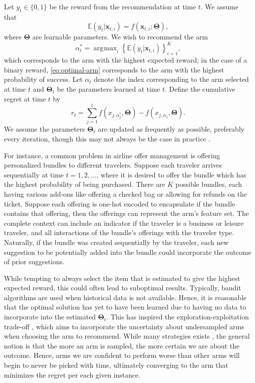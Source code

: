 \documentclass[12pt]{article}
\DeclareMathOperator*{\argmax}{\arg\!\max}
\begin{document}
Let $y_t \in \{0,1\}$ be the reward from the recommendation at time $t$. 
We assume that 
\begin{equation}
\mathbb{E}(y_t \vert \bm{x}_{t,i}) = f(\bm{x}_{t,i}; \bm{\Theta}),
\end{equation}
where $\bm{\Theta}$ are learnable parameters.
We wish to recommend the arm 
\begin{equation}
\alpha_t^* = \argmax_i \left\{\mathbb{E}(y_t \vert \bm{x}_{t,i})\right\}_{i = 1}^K,
\label{eq:optimal-arm}
\end{equation}
which corresponds to the arm with the highest expected reward; in the case of 
a binary reward, \eqref{eq:optimal-arm} corresponds to the arm with the highest 
probability of success.  
Let $\alpha_t$ denote the index corresponding to the arm selected at time $t$ and 
$\bm{\Theta}_t$ be the parameters learned at time $t$.
Define the cumulative regret at time $t$ by
\begin{equation}
r_t = \sum_{j = 1}^{t} 
f(x_{j, \alpha_j^*}, \bm{\Theta}) 
- f(x_{j, \alpha_j}, \bm{\Theta}).
\label{eq:regret}
\end{equation}
We assume the parameters $\bm{\Theta}_t$ are updated as frequently as 
possible, preferably every iteration, though this may not always be the case in 
practice \cite{joulani2013online}.

For instance, a common problem in airline offer management is offering 
personalized bundles to different travelers.
Suppose each traveler arrives sequentially at time $t = 1, 2, \ldots$, where
it is desired to offer the bundle which has the highest probability of being
purchased.
There are $K$ possible bundles, each having various add-ons like offering a
checked bag or allowing for refunds on the ticket.
Suppose each offering is one-hot encoded to encapsulate if the bundle contains
that offering, then the offerings can represent the arm's feature set.
The complete context can include an indicator if the traveler is a business 
or leisure traveler, and all interactions of the bundle's offerings with the 
traveler type. 
Naturally, if the bundle was created sequentially by the traveler, each new
suggestion to be potentially added into the bundle could incorporate the 
outcome of prior suggestions.

While tempting to always select the item that is estimated to give the highest
expected reward, this could often lead to suboptimal results.
Typically, bandit algorithms are used when historical data is not available.  
Hence, it is reasonable that the optimal solution has yet to have been learned due
to having no data to incorporate into the estimated $\bm{\Theta}_t$.
This has inspired the exploration-exploitation trade-off 
\cite{audibert2009exploration}, which aims to incorporate the uncertainty about 
undersampled arms when choosing the arm to recommend.
While many strategies exists 
\cite{chapelle2011empirical} \cite{garivier2011kl} \cite{karnin2013almost}, 
the general notion is that the more an arm is sampled, the more certain we are 
about the outcome. 
Hence, arms we are confident to perform worse than other arms will begin to never 
be picked with time, ultimately converging to the arm that minimizes the regret 
per each given instance.
\end{document}
